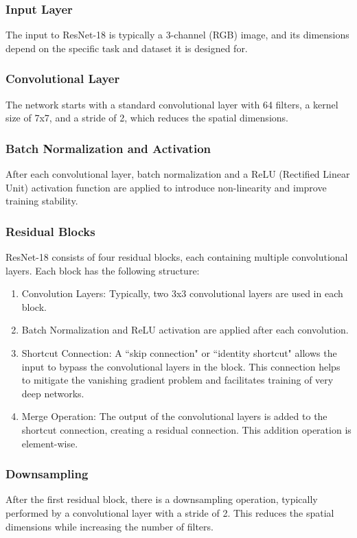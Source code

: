 \documentclass[10pt,twocolumn,letterpaper]{article}
\begin{document}
\subsubsection{Input Layer}
The input to ResNet-18 is typically a 3-channel (RGB) image, and its dimensions depend on the specific task and dataset it is designed for.

\subsubsection{Convolutional Layer}
The network starts with a standard convolutional layer with 64 filters, a kernel size of 7x7, and a stride of 2, which reduces the spatial dimensions.

\subsubsection{Batch Normalization and Activation}
After each convolutional layer, batch normalization and a ReLU (Rectified Linear Unit) activation function are applied to introduce non-linearity and improve training stability.

\subsubsection{Residual Blocks}
ResNet-18 consists of four residual blocks, each containing multiple convolutional layers. Each block has the following structure:
\begin{enumerate}
    \item Convolution Layers: Typically, two 3x3 convolutional layers are used in each block.
    \item Batch Normalization and ReLU activation are applied after each convolution.
    \item Shortcut Connection: A ``skip connection" or ``identity shortcut" allows the input to bypass the convolutional layers in the block. This connection helps to mitigate the vanishing gradient problem and facilitates training of very deep networks.
    \item Merge Operation: The output of the convolutional layers is added to the shortcut connection, creating a residual connection. This addition operation is element-wise.
\end{enumerate}

\subsubsection{Downsampling}
After the first residual block, there is a downsampling operation, typically performed by a convolutional layer with a stride of 2. This reduces the spatial dimensions while increasing the number of filters.
\end{document}
